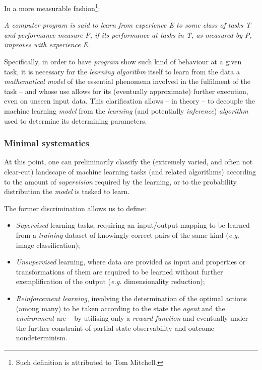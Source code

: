 In a more measurable fashion\footnote{Such definition is attributed to Tom Mitchell.}:

\begin{displayquote}
    \textit{A computer program is said to learn from experience E \wrt to some class of tasks T and performance measure P, if its performance at tasks in T, as measured by P, improves with experience E.}
\end{displayquote}

Specifically, in order to have \textit{program} show such kind of behaviour at a given task, it is necessary for the \textit{learning algorithm} itself to learn from the data a \textit{mathematical model} of the essential phenomena involved in the fulfilment of the task -- and whose use allows for its (eventually approximate) further execution, even on unseen input data. This clarification allows -- in theory -- to decouple the machine learning \textit{model} from the \textit{learning} (and potentially \textit{inference}) \textit{algorithm} used to determine its determining parameters.

\subsubsection{Minimal systematics}
At this point, one can preliminarily classify the (extremely varied, and often not clear-cut) landscape of machine learning tasks (and related algorithms) according to the amount of \textit{supervision} required by the learning, or \wrt to the probability distribution the \textit{model} is tasked to learn.

The former discrimination allows us to define:
\begin{itemize}
    \item \textit{Supervised} learning tasks, requiring an input/output mapping to be learned from a \textit{training} dataset of knowingly-correct pairs of the same kind (\textit{e.g.} image classification);
    \item \textit{Unsupervised} learning, where data are provided as input and properties or transformations of them are required to be learned without further exemplification of the output (\textit{e.g.} dimensionality reduction);
    \item \textit{Reinforcement learning}, involving the determination of the optimal actions (among many) to be taken according to the state the \textit{agent} and the \textit{environment} are -- by utilising only a \textit{reward function} and eventually under the further constraint of partial state observability and outcome nondeterminism.
\end{itemize}

